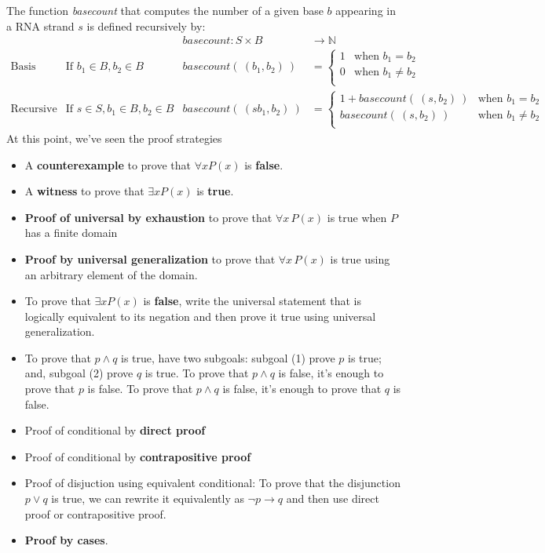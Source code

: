 \documentclass[12pt, oneside]{article}
\begin{document}
The function \textit{basecount} that computes the number of a given base 
$b$ appearing in a RNA strand $s$ is defined recursively by:
\[
\begin{array}{llll}
& & \textit{basecount} : S \times B & \to \mathbb{N} \\
\textrm{Basis Step:} &  \textrm{If } b_1 \in B, b_2 \in B & \textit{basecount}(~(b_1, b_2)~) & =
        \begin{cases}
            1 & \textrm{when } b_1 = b_2 \\
            0 & \textrm{when } b_1 \neq b_2 \\
        \end{cases} \\
\textrm{Recursive Step:} & \textrm{If } s \in S, b_1 \in B, b_2 \in B &\textit{basecount}(~(s b_1, b_2)~) & =
        \begin{cases}
            1 + \textit{basecount}(~(s, b_2)~) & \textrm{when } b_1 = b_2 \\
            \textit{basecount}(~(s, b_2)~) & \textrm{when } b_1 \neq b_2 \\
        \end{cases}
\end{array}
\] 
At this point, we've seen the proof strategies
\begin{multicols}{2}
    \begin{itemize}
        \item A {\bf counterexample} to prove that  $\forall x P(x)$ is {\bf false}.
        \item  A {\bf witness} to prove that  $\exists x P(x)$ is {\bf true}.
        \item {\bf Proof of universal by exhaustion} to prove that $\forall x \, P(x)$
    is true when $P$ has a finite domain
        \item  {\bf Proof by universal generalization} to prove that $\forall x \, P(x)$
    is true using an arbitrary element of the domain.
        \item To  prove  that $\exists x P(x)$ is {\bf false}, write the universal statement that is 
        logically equivalent to its negation and then prove it true using universal generalization.
        \item To prove that $p \land q$ is true, have two subgoals: 
        subgoal (1) prove $p$ is  true; and, subgoal (2) prove $q$ is true. To prove that $p \land q$ is false, it's enough to prove that $p$ is false.
     To prove that $p \land q$ is false, it's enough to prove that $q$ is false.
        \item Proof of conditional by {\bf direct proof}
        \item Proof of conditional by {\bf contrapositive proof}
        \item Proof of disjuction using equivalent conditional: To prove that the 
        disjunction $p \lor q$ is true, we can rewrite it equivalently as $\lnot p \to q$ and
        then use direct proof or contrapositive proof.
        \item {\bf Proof by cases}.
    \end{itemize}
\end{multicols}
\newpage
\end{document}
